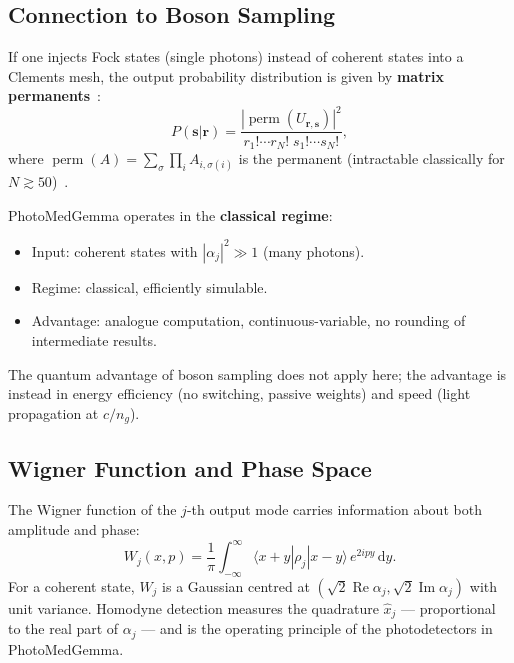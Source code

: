 \documentclass[12pt, a4paper]{article}
\newcommand{\perm}{\operatorname{perm}}
\begin{document}
\subsection{Connection to Boson Sampling}

If one injects Fock states (single photons) instead of coherent states into
a Clements mesh, the output probability distribution is given by
\textbf{matrix permanents}~\cite{aaronson2011}:
\begin{equation}
  P(\mathbf{s}|\mathbf{r}) = \frac{|\perm(U_{\mathbf{r},\mathbf{s}})|^2}
  {r_1!\cdots r_N!\; s_1!\cdots s_N!},
  \label{eq:boson_sampling}
\end{equation}
where $\perm(A) = \sum_\sigma \prod_i A_{i,\sigma(i)}$ is the permanent
(intractable classically for $N\gtrsim 50$)~\cite{aaronson2011}.

PhotoMedGemma operates in the \textbf{classical regime}:
\begin{itemize}
  \item Input: coherent states with $|\alpha_j|^2 \gg 1$ (many photons).
  \item Regime: classical, efficiently simulable.
  \item Advantage: analogue computation, continuous-variable, no rounding
    of intermediate results.
\end{itemize}
The quantum advantage of boson sampling does not apply here; the advantage
is instead in energy efficiency (no switching, passive weights) and speed
(light propagation at $c/n_g$).

\subsection{Wigner Function and Phase Space}

The Wigner function of the $j$-th output mode carries information about
both amplitude and phase:
\begin{equation}
  W_j(x,p) = \frac{1}{\pi}\int_{-\infty}^\infty
  \langle x+y|\rho_j|x-y\rangle\,e^{2ipy}\,\mathrm{d}y.
  \label{eq:wigner}
\end{equation}
For a coherent state, $W_j$ is a Gaussian centred at $(\sqrt{2}\operatorname{Re}\alpha_j,
\sqrt{2}\operatorname{Im}\alpha_j)$ with unit variance.
Homodyne detection measures the quadrature $\hat{x}_j$ — proportional to
the real part of $\alpha_j$ — and is the operating principle of the
photodetectors in PhotoMedGemma.

\end{document}

